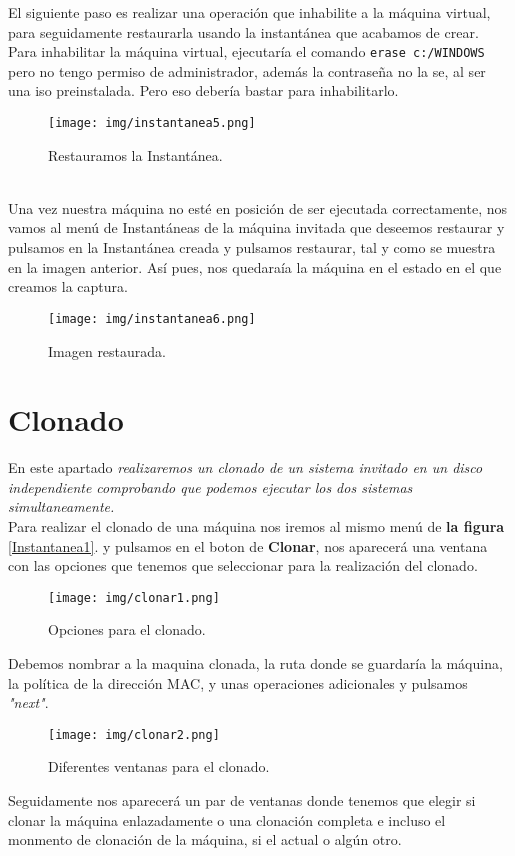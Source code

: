 \documentclass[12pt]{article}
\begin{document}
      \newpage

      El siguiente paso es realizar una operación que inhabilite a la máquina virtual, para seguidamente restaurarla usando la 
      instantánea que acabamos de crear.
      \\
      Para inhabilitar la máquina virtual, ejecutaría el comando \texttt{erase c:/WINDOWS} pero no tengo permiso de administrador,
      además la contraseña no la se, al ser una iso preinstalada. Pero eso debería bastar para inhabilitarlo.
      \begin{figure}[h]
        \centering
        \texttt{[image: img/instantanea5.png]}
        \caption{Restauramos la Instantánea.}
        \label{Instantanea5}
      \end{figure}
      \\
      Una vez nuestra máquina no esté en posición de ser ejecutada correctamente, nos vamos al menú de Instantáneas de la máquina invitada 
      que deseemos restaurar y pulsamos en la Instantánea creada y pulsamos restaurar, tal y como se muestra en la imagen anterior. Así pues, 
      nos quedaraía la máquina en el estado en el que creamos la captura. 
      \begin{figure}[h]
        \centering
        \texttt{[image: img/instantanea6.png]}
        \caption{Imagen restaurada.}
        \label{Instantanea6}
      \end{figure}
      
      \newpage
    
    \section{Clonado}
      En este apartado \textit{realizaremos un clonado de un sistema invitado en un disco independiente comprobando que 
      podemos ejecutar los dos sistemas simultaneamente.}
      \\
      Para realizar el clonado de una máquina nos iremos al mismo menú de \textbf{la figura }\ref{Instantanea1}.
      y pulsamos en el boton de \textbf{Clonar}, nos aparecerá una ventana con las opciones que tenemos que seleccionar 
      para la realización del clonado.
      \begin{figure}[h]
        \centering
        \texttt{[image: img/clonar1.png]}
        \caption{Opciones para el clonado.}
        \label{Clonado1}
      \end{figure}
      Debemos nombrar a la maquina clonada, la ruta donde se guardaría la máquina, la política de la dirección MAC, y unas 
      operaciones adicionales y pulsamos \textit{"next"}.
      \begin{figure}[h]
        \centering
        \texttt{[image: img/clonar2.png]}
        \caption{Diferentes ventanas para el clonado.}
        \label{Clonado2}
      \end{figure}
      Seguidamente nos aparecerá un par de ventanas donde tenemos que elegir si clonar la máquina enlazadamente o una clonación 
      completa e incluso el monmento de clonación de la máquina, si el actual o algún otro.
\end{document}
